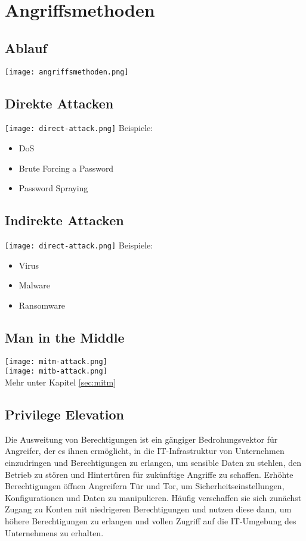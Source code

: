 \section{Angriffsmethoden}
\subsection{Ablauf}
\texttt{[image: angriffsmethoden.png]}

\subsection{Direkte Attacken}
\texttt{[image: direct-attack.png]}
Beispiele:
\begin{itemize}
  \item DoS
  \item Brute Forcing a Password
  \item Password Spraying
\end{itemize}

\subsection{Indirekte Attacken}
\texttt{[image: direct-attack.png]}
Beispiele:
\begin{itemize}
  \item Virus
  \item Malware 
  \item Ransomware
\end{itemize}

\subsection{Man in the Middle}
\texttt{[image: mitm-attack.png]}\\
\texttt{[image: mitb-attack.png]}\\
Mehr unter Kapitel \ref{sec:mitm}

\subsection{Privilege Elevation}
Die Ausweitung von Berechtigungen ist ein gängiger Bedrohungsvektor für Angreifer, der es ihnen ermöglicht, in die IT-Infrastruktur von Unternehmen einzudringen und Berechtigungen zu erlangen, um sensible Daten zu stehlen, den Betrieb zu stören und Hintertüren für zukünftige Angriffe zu schaffen. 
Erhöhte Berechtigungen öffnen Angreifern Tür und Tor, um Sicherheitseinstellungen, Konfigurationen und Daten zu manipulieren. Häufig verschaffen sie sich zunächst Zugang zu Konten mit niedrigeren Berechtigungen und nutzen diese dann, um höhere Berechtigungen zu erlangen und vollen Zugriff auf die IT-Umgebung des Unternehmens zu erhalten.\\

